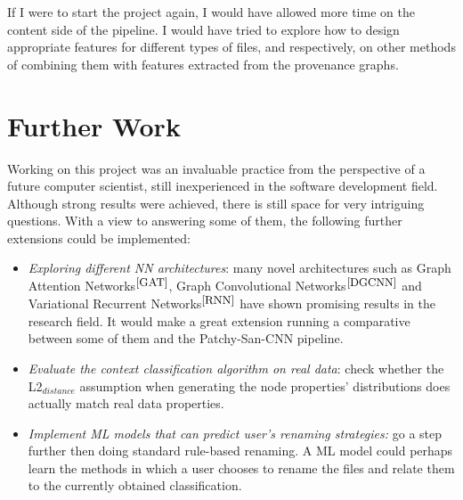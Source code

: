     If I were to start the project again, I would have allowed more time on the content side of the pipeline. I would have tried to explore how to design appropriate features for different types of files, and respectively, on other methods of combining them with features extracted from the provenance graphs. \\ 
    
    \section{Further Work}
    
    Working on this project was an invaluable practice from the perspective of a future computer scientist, still inexperienced in the software development field. Although strong results were achieved, there is still space for very intriguing questions. With a view to answering some of them, the following further extensions could be implemented:
    
    \begin{itemize}
        \item \textit{Exploring different NN architectures}: many novel architectures such as Graph Attention Networks$^{\small \cite{GAT}}$, Graph Convolutional Networks$^{\small \cite{DGCNN}}$ and Variational Recurrent Networks$^{\small \cite{RNN}}$ have shown promising results in the research field. It would make a great extension running a comparative between some of them and the Patchy-San-CNN pipeline.
        
        \item \textit{Evaluate the context classification algorithm on real data}: check whether the L2$_{distance}$ assumption when generating the node properties' distributions does actually match real data properties. 
        
        \item \textit{Implement ML models that can predict user's renaming strategies:} go a step further then doing standard rule-based renaming. A ML model could perhaps learn the methods in which a user chooses to rename the files and relate them to the currently obtained classification.    
    
    \end{itemize}
    
